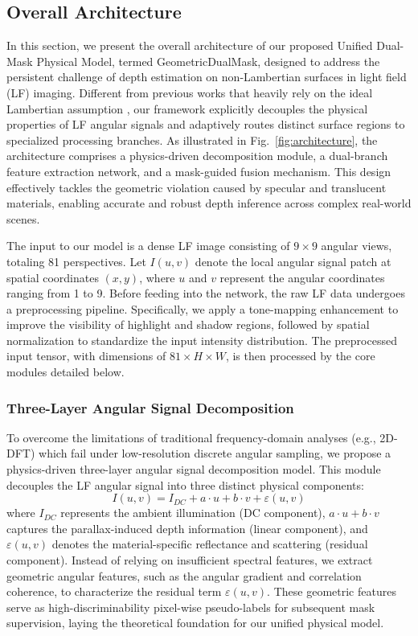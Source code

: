 \subsection{Overall Architecture}

In this section, we present the overall architecture of our proposed Unified Dual-Mask Physical Model, termed GeometricDualMask, designed to address the persistent challenge of depth estimation on non-Lambertian surfaces in light field (LF) imaging. Different from previous works that heavily rely on the ideal Lambertian assumption \cite{smith2023epinet}, our framework explicitly decouples the physical properties of LF angular signals and adaptively routes distinct surface regions to specialized processing branches. As illustrated in Fig.~\ref{fig:architecture}, the architecture comprises a physics-driven decomposition module, a dual-branch feature extraction network, and a mask-guided fusion mechanism. This design effectively tackles the geometric violation caused by specular and translucent materials, enabling accurate and robust depth inference across complex real-world scenes.

The input to our model is a dense LF image consisting of $9 \times 9$ angular views, totaling 81 perspectives. Let $I(u,v)$ denote the local angular signal patch at spatial coordinates $(x,y)$, where $u$ and $v$ represent the angular coordinates ranging from 1 to 9. Before feeding into the network, the raw LF data undergoes a preprocessing pipeline. Specifically, we apply a tone-mapping enhancement to improve the visibility of highlight and shadow regions, followed by spatial normalization to standardize the input intensity distribution. The preprocessed input tensor, with dimensions of $81 \times H \times W$, is then processed by the core modules detailed below.

\subsubsection{Three-Layer Angular Signal Decomposition}
To overcome the limitations of traditional frequency-domain analyses (e.g., 2D-DFT) which fail under low-resolution discrete angular sampling, we propose a physics-driven three-layer angular signal decomposition model. This module decouples the LF angular signal into three distinct physical components:
\begin{equation}
I(u,v) = I_{DC} + a \cdot u + b \cdot v + \varepsilon(u,v)
\label{eq:ch3_1}
\end{equation}
where $I_{DC}$ represents the ambient illumination (DC component), $a \cdot u + b \cdot v$ captures the parallax-induced depth information (linear component), and $\varepsilon(u,v)$ denotes the material-specific reflectance and scattering (residual component). Instead of relying on insufficient spectral features, we extract geometric angular features, such as the angular gradient and correlation coherence, to characterize the residual term $\varepsilon(u,v)$. These geometric features serve as high-discriminability pixel-wise pseudo-labels for subsequent mask supervision, laying the theoretical foundation for our unified physical model.

